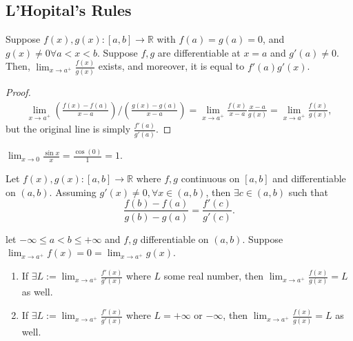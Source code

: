 \subsection{L'Hopital's Rules}

\begin{proposition}
    Suppose $f(x), g(x) : [a, b] \to \mathbb{R}$ with $f(a) = g(a) = 0$, and $g(x) \neq 0 \forall a < x < b$. Suppose $f, g$ are differentiable at $x=a$ and $g'(a) \neq 0$. Then, $\lim_{x \to a^+} \frac{f(x)}{g(x)}$ exists, and moreover, it is equal to $f'(a){g'(x)}$.
\end{proposition}

\begin{proof}
    \begin{align*}
        \lim_{x \to a^+} (\frac{f(x) - f(a)}{x-a}) / (\frac{g(x) - g(a)}{x-a}) = \lim_{x \to a^+} \frac{f(x)}{x-a} \frac{x-a}{g(x)} = \lim_{x \to a^+} \frac{f(x)}{g(x)},
    \end{align*}
    but the original line is simply $\frac{f'(a)}{g'(a)}$.
\end{proof}

\begin{example}
    $\lim_{x \to 0} \frac{\sin x}{x} = \frac{\cos(0)}{1} = 1.$
\end{example}

\begin{theorem}
    Let $f(x), g(x) : [a, b] \to \mathbb{R}$ where $f, g$ continuous on $[a, b]$ and differentiable on $(a, b)$. Assuming $g'(x) \neq 0, \forall x \in (a,b)$, then $\exists c \in (a, b)$ such that \[
    \frac{f(b) - f(a)}{g(b) - g(a)} = \frac{f'(c)}{g'(c)}    .
    \]
\end{theorem}

\begin{proposition}
    let $-\infty \leq a < b \leq + \infty$ and $f, g$ differentiable on $(a,b)$. Suppose $\lim_{x \to a^+}f(x) = 0 = \lim_{x \to a^+} g(x)$. \begin{enumerate}
        \item If $\exists L := \lim_{x \to a^+} \frac{f'(x)}{g'(x)}$ where $L$ some real number, then $\lim_{x \to a^+} \frac{f(x)}{g(x)} = L$ as well.
        \item If $\exists L := \lim_{x \to a^+} \frac{f'(x)}{g'(x)}$ where $L = + \infty$ or $-\infty$, then $\lim_{x \to a^+} \frac{f(x)}{g(x)} = L$ as well.
    \end{enumerate}
\end{proposition}


